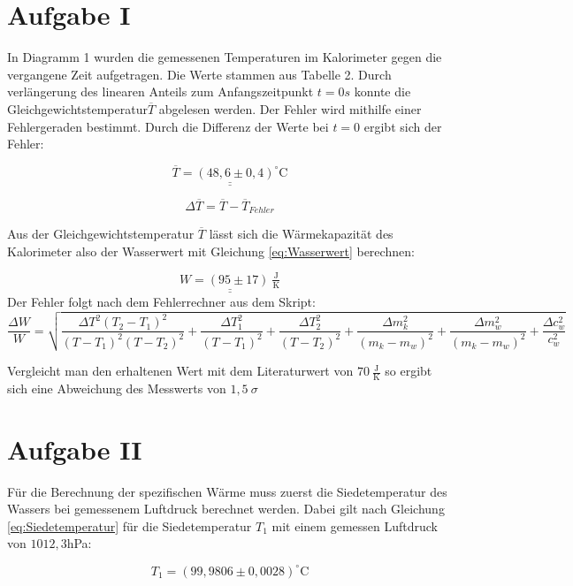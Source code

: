 \section{Aufgabe I}

In Diagramm 1 wurden die gemessenen Temperaturen im Kalorimeter gegen die vergangene Zeit aufgetragen. Die Werte
stammen aus Tabelle 2. Durch verlängerung des linearen Anteils zum Anfangszeitpunkt $t = 0s$ konnte die Gleichgewichtstemperatur$\overline{T}$ abgelesen werden.
Der Fehler wird mithilfe einer Fehlergeraden bestimmt. Durch die Differenz der Werte bei $t=0$ ergibt sich der Fehler:

\[ \underline{\underline{\overline{T} = (48,6 \pm 0,4)^\circ \text{C}}}\]

\begin{equation}
    \Delta \overline{T}= \overline{T}- \overline{T}_{Fehler}
\end{equation}

Aus der Gleichgewichtstemperatur $\overline{T}$ lässt sich die Wärmekapazität des Kalorimeter also der Wasserwert mit Gleichung \ref{eq:Wasserwert} berechnen:

\[\underline{\underline{W= ( 95 \pm  17)\ \tfrac{\text{J}}{\text{K}}}}\]
Der Fehler folgt nach dem Fehlerrechner aus dem Skript:
\begin{equation}
    \frac{\Delta W}{W}=\sqrt{\frac{\Delta T^{2} \left(T_{2} - T_{1} \right)^{2}}{\left(T - T_{1}\right)^{2} \left(T - T_{2}\right)^{2}} + \frac{\Delta T_{1}^{2}}{\left(T - T_{1}\right)^{2}} + \frac{\Delta T_{2}^{2}}{\left(T - T_{2}\right)^{2}} + \frac{\Delta m_{k}^{2}}{\left(m_{k} - m_{w}\right)^{2}} + \frac{\Delta m_{w}^{2}}{\left(m_{k} - m_{w}\right)^{2}} + \frac{\Delta c_{w}^{2}}{c_{w}^{2}}}
\end{equation}

Vergleicht man den erhaltenen Wert mit dem Literaturwert von $70 \ \tfrac{\text{J}}{\text{K}}$ so ergibt sich eine Abweichung des Messwerts von $1,5 \ \sigma$

\section{Aufgabe II}

Für die Berechnung der spezifischen Wärme muss zuerst die Siedetemperatur des Wassers bei gemessenem Luftdruck berechnet werden. Dabei gilt nach Gleichung \ref{eq:Siedetemperatur}
für die Siedetemperatur $T_1$ mit einem gemessen Luftdruck von $1012,3$hPa:

\[T_1 = (99,9806 \pm 0,0028) ^\circ \text{C}\]

